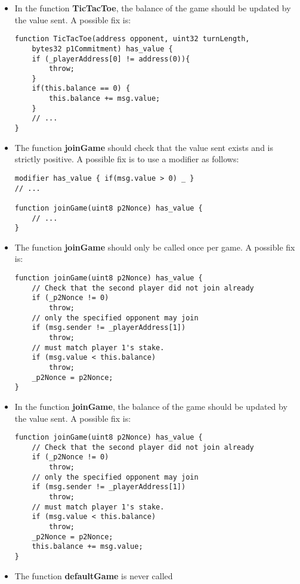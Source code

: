 \documentclass[11pt]{article}
\begin{document}
\begin{enumerate}
\begin{itemize}
        \item In the function \textbf{TicTacToe}, the balance of the game should be updated by the value sent. A possible fix is:
        \begin{verbatim}
function TicTacToe(address opponent, uint32 turnLength, 
    bytes32 p1Commitment) has_value {
    if (_playerAddress[0] != address(0)){
        throw;
    }
    if(this.balance == 0) {
        this.balance += msg.value;
    }
    // ...
}
        \end{verbatim}
        
        \item The function \textbf{joinGame} should check that the value sent exists and is strictly positive. A possible fix is to use a modifier as follows:
        \begin{verbatim}
modifier has_value { if(msg.value > 0) _ }
// ...

function joinGame(uint8 p2Nonce) has_value {
    // ...
}
        \end{verbatim}
        
        \item The function \textbf{joinGame} should only be called once per game. A possible fix is:
        \begin{verbatim}
function joinGame(uint8 p2Nonce) has_value {
    // Check that the second player did not join already
    if (_p2Nonce != 0)
        throw;
    // only the specified opponent may join
    if (msg.sender != _playerAddress[1])
        throw;
    // must match player 1's stake.
    if (msg.value < this.balance)
        throw;
    _p2Nonce = p2Nonce;
}
        \end{verbatim}
        
        \item In the function \textbf{joinGame}, the balance of the game should be updated by the value sent. A possible fix is:
        \begin{verbatim}
function joinGame(uint8 p2Nonce) has_value {
    // Check that the second player did not join already
    if (_p2Nonce != 0)
        throw;
    // only the specified opponent may join
    if (msg.sender != _playerAddress[1])
        throw;
    // must match player 1's stake.
    if (msg.value < this.balance)
        throw;
    _p2Nonce = p2Nonce;
    this.balance += msg.value;
}
        \end{verbatim}
        
        \item The function \textbf{defaultGame} is never called
        
        
    \end{itemize}

\end{enumerate}
\end{document}
